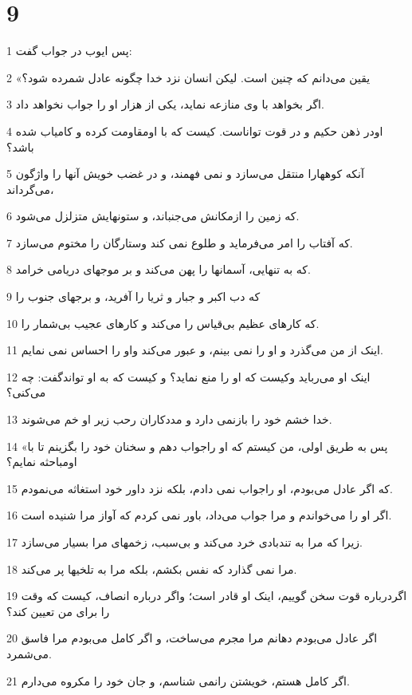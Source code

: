 \chapter{9}

\par 1 پس ایوب در جواب گفت:
\par 2 «یقین می‌دانم که چنین است. لیکن انسان نزد خدا چگونه عادل شمرده شود؟
\par 3 اگر بخواهد با وی منازعه نماید، یکی از هزار او را جواب نخواهد داد.
\par 4 اودر ذهن حکیم و در قوت تواناست. کیست که با اومقاومت کرده و کامیاب شده باشد؟
\par 5 آنکه کوههارا منتقل می‌سازد و نمی فهمند، و در غضب خویش آنها را واژگون می‌گرداند،
\par 6 که زمین را ازمکانش می‌جنباند، و ستونهایش متزلزل می‌شود.
\par 7 که آفتاب را امر می‌فرماید و طلوع نمی کند وستارگان را مختوم می‌سازد.
\par 8 که به تنهایی، آسمانها را پهن می‌کند و بر موجهای دریامی خرامد.
\par 9 که دب اکبر و جبار و ثریا را آفرید، و برجهای جنوب را
\par 10 که کارهای عظیم بی‌قیاس را می‌کند و کارهای عجیب بی‌شمار را.
\par 11 اینک از من می‌گذرد و او را نمی بینم، و عبور می‌کند واو را احساس نمی نمایم.
\par 12 اینک او می‌رباید وکیست که او را منع نماید؟ و کیست که به او تواندگفت: چه می‌کنی؟
\par 13 خدا خشم خود را بازنمی دارد و مددکاران رحب زیر او خم می‌شوند.
\par 14 «پس به طریق اولی، من کیستم که او راجواب دهم و سخنان خود را بگزینم تا با اومباحثه نمایم؟
\par 15 که اگر عادل می‌بودم، او راجواب نمی دادم، بلکه نزد داور خود استغاثه می‌نمودم.
\par 16 اگر او را می‌خواندم و مرا جواب می‌داد، باور نمی کردم که آواز مرا شنیده است.
\par 17 زیرا که مرا به تندبادی خرد می‌کند و بی‌سبب، زخمهای مرا بسیار می‌سازد.
\par 18 مرا نمی گذارد که نفس بکشم، بلکه مرا به تلخیها پر می‌کند.
\par 19 اگردرباره قوت سخن گوییم، اینک او قادر است؛ واگر درباره انصاف، کیست که وقت را برای من تعیین کند؟
\par 20 اگر عادل می‌بودم دهانم مرا مجرم می‌ساخت، و اگر کامل می‌بودم مرا فاسق می‌شمرد.
\par 21 اگر کامل هستم، خویشتن رانمی شناسم، و جان خود را مکروه می‌دارم.
